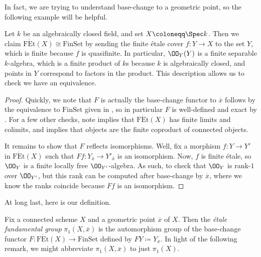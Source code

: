 \documentclass{amsart}
\begin{document}
In fact, we are trying to understand base-change to a geometric point, so the following example will be helpful.
\begin{example} \label{ex:pi-k-alg-closed}
    Let $k$ be an algebraically closed field, and set $X\coloneqq\Spec k$. Then we claim $\mathrm{F\acute Et}(X)\cong\mathrm{FinSet}$ by sending the finite \'etale cover $f\colon Y\to X$ to the set $Y$, which is finite because $f$ is quasifinite. In particular, $\OO_Y(Y)$ is a finite separable $k$-algebra, which is a finite product of $k$s because $k$ is algebraically closed, and points in $Y$ correspond to factors in the product. This description allows us to check we have an equivalence.
\end{example}
\mainschemethm*
\begin{proof}
    Quickly, we note that $F$ is actually the base-change functor to $\overline x$ follows by the equivalence to $\mathrm{FinSet}$ given in , so in particular $F$ is well-defined and exact by . For a few other checks, note  implies that $\mathrm{F\acute Et}(X)$ has finite limits and colimits, and  implies that objects are the finite coproduct of connected objects.

    It remains to show that $F$ reflects isomorphisms. Well, fix a morphism $f\colon Y\to Y'$ in $\mathrm{F\acute Et}(X)$ such that $Ff\colon Y_{\overline x}\to Y'_{\overline x}$ is an isomorphism.
    Now, $f$ is finite \'etale, so $\OO_{Y}$ is a finite locally free $\OO_{Y'}$-algebra. As such, to check that $\OO_Y$ is rank-$1$ over $\OO_{Y'}$, but this rank can be computed after base-change by $\overline x$, where we know the ranks coincide because $Ff$ is an isomorphism.
\end{proof}
At long last, here is our definition.
\begin{definition} \label{def:etale-fund-group}
    Fix a connected scheme $X$ and a geometric point $\overline x$ of $X$. Then the \textit{\'etale fundamental group} $\pi_1(X,\overline x)$ is the automorphism group of the base-change functor $F\colon\mathrm{F\acute Et}(X)\to\mathrm{FinSet}$ defined by $FY\coloneqq Y_{\overline x}$. In light of the following remark, we might abbreviate $\pi_1(X,\overline x)$ to just $\pi_1(X)$.
\end{definition}
\end{document}
